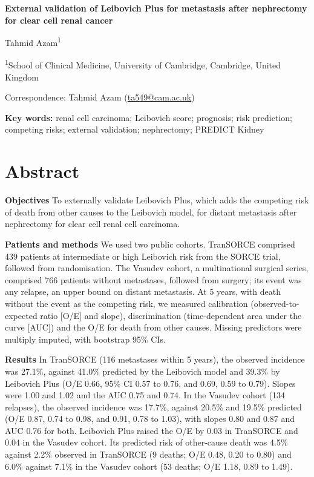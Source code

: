 \documentclass[11pt,a4paper]{article}
\begin{document}
\begin{titlepage}
\begin{center}
{\Large\bfseries External validation of Leibovich Plus for metastasis after nephrectomy for clear cell renal cancer\par}
\vspace{1.5em}
Tahmid Azam\textsuperscript{1}\par
\vspace{1em}
\textsuperscript{1}School of Clinical Medicine, University of Cambridge, Cambridge, United Kingdom\par
\vspace{1em}
Correspondence: Tahmid Azam (\href{mailto:ta549@cam.ac.uk}{ta549@cam.ac.uk})\par
\end{center}
\vfill
\textbf{Key words:} renal cell carcinoma; Leibovich score; prognosis; risk prediction; competing risks; external validation; nephrectomy; PREDICT Kidney\par
\end{titlepage}

\section*{Abstract}

\textbf{Objectives} To externally validate Leibovich Plus, which adds the competing risk of death from other causes to the Leibovich model, for distant metastasis after nephrectomy for clear cell renal cell carcinoma.

\textbf{Patients and methods} We used two public cohorts. TranSORCE comprised 439 patients at intermediate or high Leibovich risk from the SORCE trial, followed from randomisation. The Vasudev cohort, a multinational surgical series, comprised 766 patients without metastases, followed from surgery; its event was any relapse, an upper bound on distant metastasis. At 5 years, with death without the event as the competing risk, we measured calibration (observed-to-expected ratio [O/E] and slope), discrimination (time-dependent area under the curve [AUC]) and the O/E for death from other causes. Missing predictors were multiply imputed, with bootstrap 95\% CIs.

\textbf{Results} In TranSORCE (116 metastases within 5 years), the observed incidence was 27.1\%, against 41.0\% predicted by the Leibovich model and 39.3\% by Leibovich Plus (O/E 0.66, 95\% CI 0.57 to 0.76, and 0.69, 0.59 to 0.79). Slopes were 1.00 and 1.02 and the AUC 0.75 and 0.74. In the Vasudev cohort (134 relapses), the observed incidence was 17.7\%, against 20.5\% and 19.5\% predicted (O/E 0.87, 0.74 to 0.98, and 0.91, 0.78 to 1.03), with slopes 0.80 and 0.87 and AUC 0.76 for both. Leibovich Plus raised the O/E by 0.03 in TranSORCE and 0.04 in the Vasudev cohort. Its predicted risk of other-cause death was 4.5\% against 2.2\% observed in TranSORCE (9 deaths; O/E 0.48, 0.20 to 0.80) and 6.0\% against 7.1\% in the Vasudev cohort (53 deaths; O/E 1.18, 0.89 to 1.49).
\end{document}
